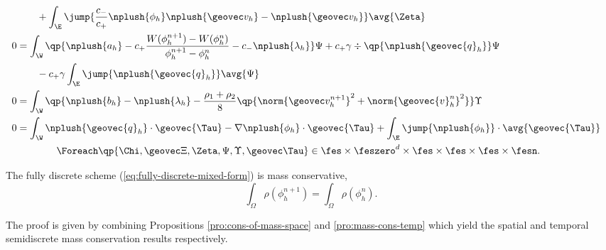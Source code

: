 \documentclass[final]{amsart}
\numberwithin{equation}{section}
\begin{document}
\begin{equation}
\begin{split}
    \\&\qquad +
    \int_\E \jump{\frac{c_-}{c_+}\nplush{\phi_h}\nplush{\geovec v_h} - \nplush{\geovec v_h}}\avg{\Zeta} 
    \\
    0 &=
    \int_\W
    \qp{\nplush{a_h} - c_+ \frac{W(\phi_h^{n+1})-W(\phi_h^n)}{\phi_h^{n+1}-\phi_h^n} - c_- \nplush{\lambda_h}} \Psi + c_+ \gamma \div\qp{\nplush{{\geovec{q}}_h}} \Psi
    \\
    &\qquad - c_+\gamma\int_\E \jump{\nplush{{\geovec{q}}_h}}\avg{\Psi}
    \\
    0 &=
    \int_\W
    \qp{\nplush{b_h} - \nplush{\lambda_h} -\frac{\rho_1 + \rho_2}{8}\qp{\norm{\geovec v_h^{n+1}}^2 + \norm{{\geovec{v}}_h^n}^2}}\Upsilon
    \\
    0 &=
    \int_\W 
    \nplush{{\geovec{q}}_h} \cdot {\geovec{\Tau}}
    -
    \nabla \nplush{\phi_h} \cdot {\geovec{\Tau}}
    +
    \int_\E 
    \jump{\nplush{\phi_h}} \cdot \avg{{\geovec{\Tau}}}
    \\
    &\qquad\qquad \Foreach \qp{\Chi, \geovec \Xi, \Zeta, \Psi, \Upsilon,\geovec \Tau} 
    \in
    {\fes\times\feszero^d\times\fes\times\fes\times\fes\times\fesn.}
  \end{split}
\end{equation}
\begin{Pro}
The fully discrete scheme (\ref{eq:fully-discrete-mixed-form}) is mass conservative, \ie
\begin{equation}
  \int_\Omega \rho(\phi_h^{n+1}) = \int_\Omega \rho(\phi_h^n).
\end{equation}
\end{Pro}
\begin{Proof}
  The proof is given by combining Propositions
  \ref{pro:cons-of-mass-space} and \ref{pro:mass-cons-temp} which
  yield the spatial and temporal semidiscrete mass conservation
  results respectively.
\end{Proof}
\end{document}
